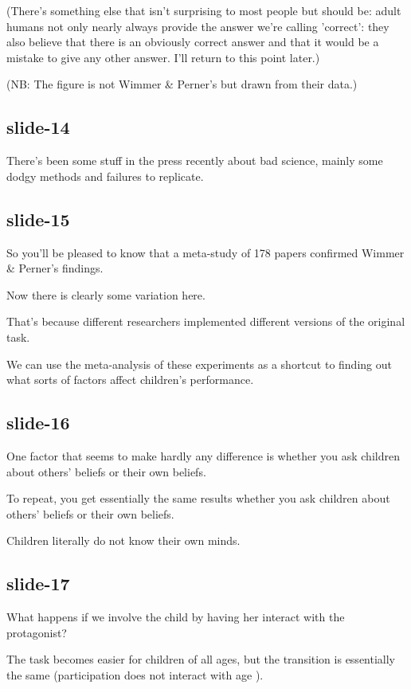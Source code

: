 \documentclass[12pt,\papersize]{extarticle}
\begin{document}
(There's something else that isn't surprising to most people but should be: adult humans not only nearly always provide the answer we're calling 'correct': they also believe that there is an obviously correct answer and that it would be a mistake to give any other answer.  I'll return to this point later.)

(NB: The figure is not Wimmer \& Perner's but drawn from their data.)

\subsection{slide-14}
There's been some stuff in the press recently about bad science, mainly some dodgy methods and failures to replicate.

\subsection{slide-15}
So you'll be pleased to know that a meta-study of 178 papers confirmed Wimmer \& Perner's findings.

Now there is clearly some variation here.

That's because different researchers implemented different versions of the original task.

We can use the meta-analysis of these experiments as a shortcut to finding out what sorts of factors affect children's performance.

\subsection{slide-16}
One factor that seems to make hardly any difference is whether you ask children about others' beliefs or their own beliefs.

To repeat, you get essentially the same results whether you ask children about others' beliefs or their own beliefs.

Children literally do not know their own minds.

\subsection{slide-17}
What happens if we involve the child by having her interact with the protagonist?

The task becomes easier for children of all ages, but the transition is essentially the same
          (participation does not interact with age \citealp[pp.\ 665-7]{Wellman:2001lz}).
\end{document}

